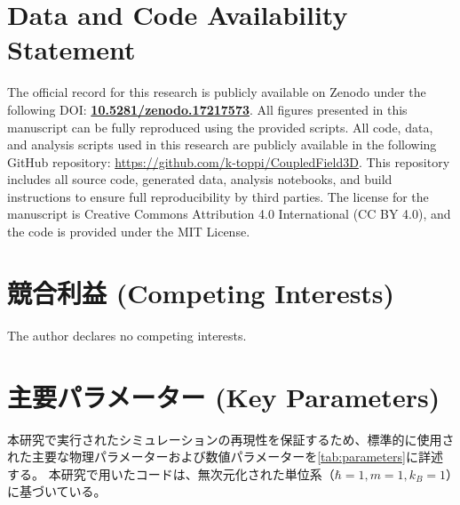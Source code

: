 \documentclass[a4paper,11pt,ja=standard,lualatex]{bxjsarticle}
\begin{document}
\section*{Data and Code Availability Statement}
The official record for this research is publicly available on Zenodo under the following DOI: \href{https://doi.org/10.5281/zenodo.17217573}{\textbf{10.5281/zenodo.17217573}}.
All figures presented in this manuscript can be fully reproduced using the provided scripts.
All code, data, and analysis scripts used in this research are publicly available in the following GitHub repository: \url{https://github.com/k-toppi/CoupledField3D}.
This repository includes all source code, generated data, analysis notebooks, and build instructions to ensure full reproducibility by third parties.
The license for the manuscript is Creative Commons Attribution 4.0 International (CC BY 4.0), and the code is provided under the MIT License.

\section*{競合利益 (Competing Interests)}
The author declares no competing interests.

\FloatBarrier




\appendix
\FloatBarrier

\section{主要パラメーター (Key Parameters)}
\label{sec:appendix_params}
本研究で実行されたシミュレーションの再現性を保証するため、標準的に使用された主要な物理パラメーターおよび数値パラメーターを\cref{tab:parameters}に詳述する。
本研究で用いたコードは、無次元化された単位系（$\hbar=1, m=1, k_B=1$）に基づいている。
\end{document}
